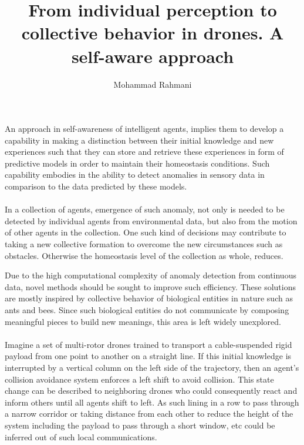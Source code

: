 \documentclass{article}
\begin{document}
	
	\title{From individual perception to collective behavior in drones. A self-aware approach}
	\author{Mohammad Rahmani}
	\date{}
	\maketitle
	
	\paragraph{} An approach in self-awareness of intelligent agents, implies them to develop a capability in making a distinction between their initial knowledge and new experiences such that they can store and retrieve these experiences in form of predictive models in order to maintain their homeostasis conditions. Such capability embodies in the ability to detect anomalies in sensory data in comparison to the data predicted by these models. 
	
	\paragraph{}In a collection of agents, emergence of such anomaly, not only is needed to be detected by individual agents from environmental data, but also from the motion of other agents in the collection. One such kind of decisions may contribute to taking a new collective formation to overcome the new circumstances such as obstacles. Otherwise the homeostasis level of the collection as whole, reduces. 
	
	Due to the high computational complexity of anomaly detection from continuous data, novel methods should be sought to improve such efficiency. These solutions are mostly inspired by collective behavior of biological entities in nature such as ants and bees. Since such biological entities do not communicate by composing meaningful pieces to build new meanings, this area is left widely unexplored.
	
	\paragraph{} Imagine a set of multi-rotor drones trained to transport a cable-suspended rigid payload from one point to another on a straight line. If this initial knowledge is interrupted by a vertical column on the left side of the trajectory, then an agent's collision avoidance system enforces a left shift to avoid collision. This state change can be described to neighboring drones who could consequently react and inform others until all agents shift to left. As such lining in a row to pass through a narrow corridor or taking distance from each other to reduce the height of the system including the payload to pass through a short window, etc could be inferred out of such local communications.
	
\end{document}
